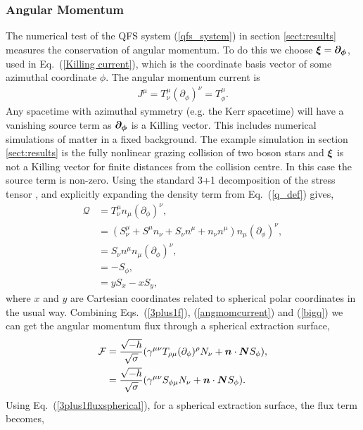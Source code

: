 \subsubsection{Angular Momentum} \label{sect:angmom}
The numerical test of the QFS system (\ref{qfs_system}) in section \ref{sect:results} measures the conservation of angular momentum. To do this we choose $\boldsymbol{\xi} = \boldsymbol{\partial_\phi}$, used in Eq.~(\ref{Killing current}), which is the coordinate basis vector of some azimuthal coordinate $\phi$. The angular momentum current is
\begin{align}
\label{angmomcurrent} J^\mu = T^\mu_\nu (\partial_\phi)^\nu=T^\mu_\phi.
\end{align}
Any spacetime with azimuthal symmetry (e.g. the Kerr spacetime) will have a vanishing source term as $\boldsymbol{\partial_\phi}$ is a Killing vector. This includes numerical simulations of matter in a fixed background. The example simulation in section \ref{sect:results} is the fully nonlinear grazing collision of two boson stars and $\boldsymbol{\xi}$ is not a Killing vector for finite distances from the collision centre. In this case the source term is non-zero. Using the standard 3+1 decomposition of the stress tensor \cite{gourgoulhon20073+}, \cite{alcubierre2008introduction} and explicitly expanding the density term from Eq.~(\ref{q_def}) gives,
\begin{align}
 \label{q_def_angmom}\mathcal{Q} &= T^\mu_\nu n_\mu ({\partial_\phi})^\nu, \\
       &= (S^\mu_\nu + S^\mu n_\nu + S_\nu n^\mu + n_\nu n^\mu) n_\mu (\partial_\phi)^\nu, \\
       &=  S_\nu n^\mu  n_\mu (\partial_\phi)^\nu, \\
       \label{bigq}&= -S_\phi, \\
       \label{q_explicit}&= y S_x - x S_y,
\end{align}
where $x$ and $y$ are Cartesian coordinates related to spherical polar coordinates in the usual way. Combining Eqs.~(\ref{3plus1f}), (\ref{angmomcurrent}) and (\ref{bigq}) we can get the angular momentum flux through a spherical extraction surface,
\begin{align}
 \mathcal{F} &= \frac{\sqrt{-h}}{\sqrt{\sigma}} (\gamma^{\mu\nu} T_{\rho\mu} (\partial_\phi)^\rho N_\nu + \boldsymbol{n} \cdot \boldsymbol{N} S_\phi),\\
             &= \frac{\sqrt{-h}}{\sqrt{\sigma}} (\gamma^{\mu\nu} S_{\phi\mu} N_\nu + \boldsymbol{n} \cdot \boldsymbol{N} S_\phi).
\end{align}
Using Eq.~(\ref{3plus1fluxspherical}), for a spherical extraction surface, the flux term becomes,
